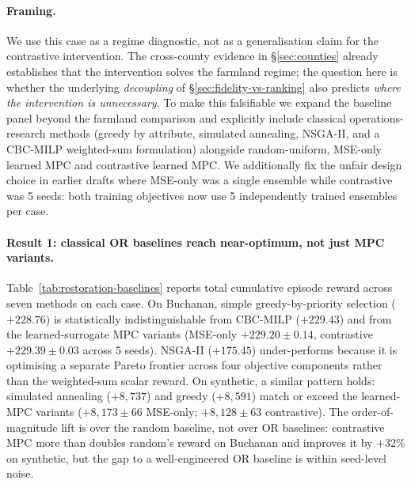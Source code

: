 \documentclass[11pt]{article}
\begin{document}
\paragraph{Framing.} We use this case as a regime diagnostic, not as a generalisation claim for the contrastive intervention. The cross-county evidence in \S\ref{sec:counties} already establishes that the intervention solves the farmland regime; the question here is whether the underlying \emph{decoupling} of \S\ref{sec:fidelity-vs-ranking} also predicts \emph{where the intervention is unnecessary}. To make this falsifiable we expand the baseline panel beyond the farmland comparison and explicitly include classical operations-research methods (greedy by attribute, simulated annealing, NSGA-II, and a CBC-MILP weighted-sum formulation) alongside random-uniform, MSE-only learned MPC and contrastive learned MPC. We additionally fix the unfair design choice in earlier drafts where MSE-only was a single ensemble while contrastive was 5 seeds: both training objectives now use 5 independently trained ensembles per case.

\paragraph{Result 1: classical OR baselines reach near-optimum, not just MPC variants.} Table~\ref{tab:restoration-baselines} reports total cumulative episode reward across seven methods on each case. On Buchanan, simple greedy-by-priority selection ($+228.76$) is statistically indistinguishable from CBC-MILP ($+229.43$) and from the learned-surrogate MPC variants (MSE-only $+229.20 \pm 0.14$, contrastive $+229.39 \pm 0.03$ across 5 seeds). NSGA-II ($+175.45$) under-performs because it is optimising a separate Pareto frontier across four objective components rather than the weighted-sum scalar reward. On synthetic, a similar pattern holds: simulated annealing ($+8{,}737$) and greedy ($+8{,}591$) match or exceed the learned-MPC variants ($+8{,}173 \pm 66$ MSE-only; $+8{,}128 \pm 63$ contrastive). The order-of-magnitude lift is over the random baseline, not over OR baselines: contrastive MPC more than doubles random's reward on Buchanan and improves it by $+32\%$ on synthetic, but the gap to a well-engineered OR baseline is within seed-level noise.
\end{document}
